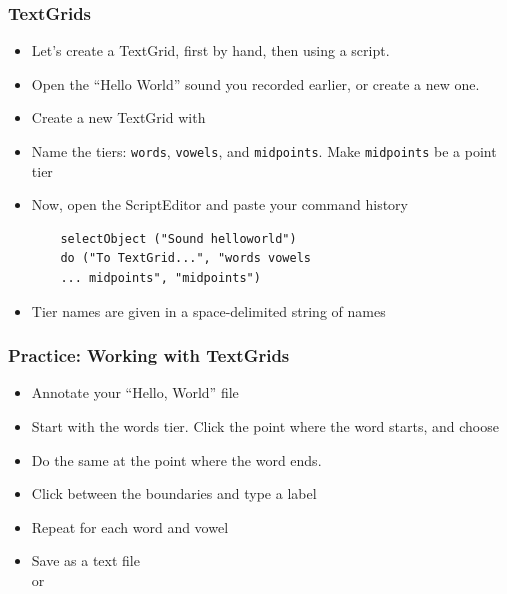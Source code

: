 \documentclass[handout]{beamer}
\begin{document}
\begin{frame}[fragile]
\frametitle{TextGrids}

\begin{itemize}
    \item <1-> Let's create a TextGrid, first by hand, then using a script.

    \item <1-> Open the ``Hello World'' sound you recorded earlier, or create a new one.

    \item <1-> Create a new TextGrid with  

    \item <1-> Name the tiers: \texttt{words}, \texttt{vowels}, and \texttt{midpoints}. Make \texttt{midpoints} be a point tier

    \item <2-> Now, open the ScriptEditor and paste your command history
    \begin{verbatim}
    selectObject ("Sound helloworld")
    do ("To TextGrid...", "words vowels
    ... midpoints", "midpoints")
    \end{verbatim}

    \item <3-> Tier names are given in a space-delimited string of names

\end{itemize}
\end{frame}

\begin{frame}[fragile]
\frametitle{Practice: Working with TextGrids}

\begin{itemize}
    \item <1-> Annotate your ``Hello, World'' file
    \vspace{\baselineskip}
    \item <1-> Start with the words tier. Click the point where the word starts, and choose 
    \item <1-> Do the same at the point where the word ends.
    \item <1-> Click between the boundaries and type a label
    \item <1-> Repeat for each word and vowel
    \item <1-> Save as a text file \\or {}
\end{itemize}
\end{frame}
\end{document}
